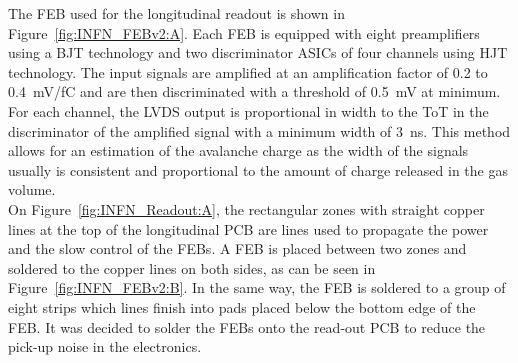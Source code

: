 	The FEB used for the longitudinal readout is shown in Figure~\ref{fig:INFN_FEBv2:A}. Each FEB is equipped with eight preamplifiers using a \acf{BJT} technology and two discriminator ASICs of four channels using \acf{HJT} technology. The input signals are amplified at an amplification factor of 0.2 to \SI{0.4}{mV/fC} and are then discriminated with a threshold of \SI{0.5}{mV} at minimum. For each channel, the LVDS output is proportional in width to the \acl{ToT} in the discriminator of the amplified signal with a minimum width of \SI{3}{ns}. This method allows for an estimation of the avalanche charge as the width of the signals usually is consistent and proportional to the amount of charge released in the gas volume.\\
	On Figure~\ref{fig:INFN_Readout:A}, the rectangular zones with straight copper lines at the top of the longitudinal PCB are lines used to propagate the power and the slow control of the FEBs. A FEB is placed between two zones and soldered to the copper lines on both sides, as can be seen in Figure~\ref{fig:INFN_FEBv2:B}. In the same way, the FEB is soldered to a group of eight strips which lines finish into pads placed below the bottom edge of the FEB. It was decided to solder the FEBs onto the read-out PCB to reduce the pick-up noise in the electronics.
	 
